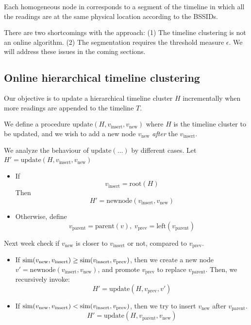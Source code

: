 Each homogeneous node in corresponds to a segment of the timeline in which all
the readings are at the same physical location according to the BSSIDs.

There are two shortcomings with the approach:
(1) The timeline clustering is not an online algorithm.
(2) The segmentation requires the threshold measure $\epsilon$.
We will address these issues in the coming sections.

\subsection{Online hierarchical timeline clustering}

Our objective is to update a hierarchical timeline cluster $H$ incrementally when
more readings are appended to the timeline $T$.

We define a procedure $\mathrm{update}(H, v_\mathrm{insert}, v_\mathrm{new})$
where $H$ is the timeline cluster to be updated, and we wish to add a new node
$v_\mathrm{new}$ {\em after} the $v_\mathrm{insert}$.

We analyze the behaviour of $\mathrm{update}(\dots)$ by different cases.
Let $H' = \mathrm{update}(H, v_\mathrm{insert}, v_\mathrm{new})$

\begin{itemize}
    \item If $$v_\mathrm{insert} = \mathrm{root}(H)$$
        Then
        $$H' = \mathrm{newnode}(v_\mathrm{insert}, v_\mathrm{new})$$
    \item Otherwise, define 
        $$v_\mathrm{parent} = \mathrm{parent}(v),\;
        v_\mathrm{prev} = \mathrm{left}(v_\mathrm{parent})$$
\end{itemize}

Next week check if $v_\mathrm{new}$ is closer to $v_\mathrm{insert}$ or
not, compared to $v_\mathrm{prev}$.
\begin{itemize}
    \item If $\mathrm{sim}(v_\mathrm{new}, v_\mathrm{insert}) \geq 
              \mathrm{sim}(v_\mathrm{insert}, v_\mathrm{prev})$, then
            we create a new node $v' = \mathrm{newnode}(v_\mathrm{insert},
            v_\mathrm{new})$, and promote $v_\mathrm{prev}$ to replace
            $v_\mathrm{parent}$.  Then, we recursively invoke:
            $$H' = \mathrm{update}(H, v_\mathrm{prev}, v')$$
    \item If $\mathrm{sim}(v_\mathrm{new}, v_\mathrm{insert})  <
              \mathrm{sim}(v_\mathrm{insert}, v_\mathrm{prev})$, then
            we try to insert $v_\mathrm{new}$ after $v_\mathrm{parent}$.
            $$H' = \mathrm{update}(H, v_\mathrm{parent}, v_\mathrm{new})$$
\end{itemize}

